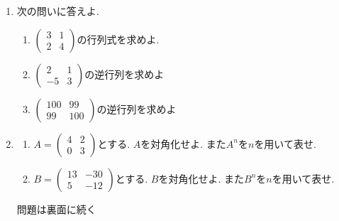 \documentclass[dvipdfmx,a4paper,12pt]{article} %
\theoremstyle{definition}
\theoremstyle{definition}
\theoremstyle{remark}
\numberwithin{equation}{section}
\begin{document}
\begin{enumerate}[label={\large \textbf{第}\arabic*\textbf{問}.}]
\item 次の問いに答えよ.
 \begin{enumerate}[label=(\arabic*)]
   \setlength{\parskip}{0cm} %
  \setlength{\itemsep}{0cm} %
\item $ \begin{pmatrix} 3 & 1 \\ 2 & 4 \end{pmatrix}$の行列式を求めよ.
\item $ \begin{pmatrix} 2 & 1 \\ -5& 3 \end{pmatrix}$の逆行列を求めよ
\item $ \begin{pmatrix} 100 & 99 \\ 99 & 100\end{pmatrix}$の逆行列を求めよ
 \end{enumerate}
 
\item   
 \begin{enumerate}[label=(\arabic*)]
   \setlength{\parskip}{0cm} %
  \setlength{\itemsep}{0cm} %
\item 
$
A=\begin{pmatrix} 4 & 2 \\ 0 & 3 \end{pmatrix}
$とする. $A$を対角化せよ. また$A^n$を$n$を用いて表せ. 
\item $
B=\begin{pmatrix} 13 & -30 \\ 5 & -12 \end{pmatrix}
$とする. $B$を対角化せよ. また$B^n$を$n$を用いて表せ. 
 \end{enumerate}
 
 \begin{flushright}
 {\Large 問題は裏面に続く}
 \end{flushright}

 \newpage
 

\end{enumerate}
\end{document}
